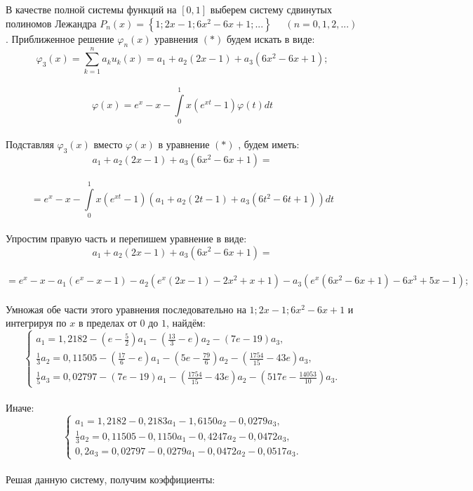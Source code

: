 \documentclass[12pt]{article}
\begin{document}
В качестве полной системы функций на $ [0,1] $ выберем систему сдвинутых полиномов Лежандра $ P_n(x) = \left\lbrace 1; 2x-1; 6x^2 - 6x+1; ... \right\rbrace  $ $ \quad (n = 0,1,2,...) $. Приближенное решение $ \varphi_n(x) $ уравнения $ (\ast) $ будем искать в виде:\\
$$ \varphi_3(x) = \sum\limits_{k=1}^n a_ku_k(x) = a_1 + a_2(2x-1) + a_3(6x^2 -6x+1); $$\\
$$ \varphi(x) = e^{x} - x - \int\limits_0^1 x(e^{xt}-1)\varphi(t) dt   $$\\
Подставляя $  \varphi_3(x) $ вместо $  \varphi(x) $ в уравнение  $(\ast)$ , будем иметь:\\
$$ a_1 + a_2(2x-1) + a_3(6x^2 -6x+1) =$$\\
$$= e^{x} - x - \int\limits_0^1 x(e^{xt}-1)(a_1 + a_2(2t-1) + a_3(6t^2 -6t+1)) dt $$\\
Упростим правую часть и перепишем уравнение в виде:\\
$$ a_1 + a_2(2x-1) + a_3(6x^2 -6x+1) =$$\\
$$= e^x - x - a_1(e^x - x - 1) - a_2(e^x(2x-1)-2x^2 + x + 1) - a_3(e^x(6x^2 - 6x + 1) - 6x^3 + 5x - 1) ;  $$\\
Умножая обе части этого уравнения последовательно на $ 1; 2x-1; 6x^2 - 6x+1 $ и интегрируя по $ x $ в пределах от $ 0 $ до $ 1 $, найдём:\\
\begin{equation*}
\begin{cases}
a_1 = 1,2182 - (e - \frac{5}{2})a_1 - (\frac{13}{3}-e)a_2 - (7e-19)a_3 , \\ 
\frac{1}{3}a_2 = 0,11505 - (\frac{17}{6} - e)a_1 - (5e - \frac{79}{6})a_2 - (\frac{1754}{15}-43e)a_3 ,\\
\frac{1}{5}a_3 = 0,02797 - (7e - 19)a_1 - (\frac{1754}{15} - 43e)a_2 - (517e - \frac{14053}{10})a_3 .
\end{cases}
\end{equation*}\\
Иначе:\\
\begin{equation*}
\begin{cases}
a_1 = 1,2182 - 0,2183a_1 - 1,6150a_2 - 0,0279a_3 , \\ 
\frac{1}{3}a_2 = 0,11505 - 0,1150a_1 - 0,4247a_2 - 0,0472a_3 ,\\
0,2a_3 = 0,02797 - 0,0279a_1 - 0,0472a_2 - 0,0517a_3 .
\end{cases}
\end{equation*}\\
Решая данную систему, получим коэффициенты:\\
\end{document}
